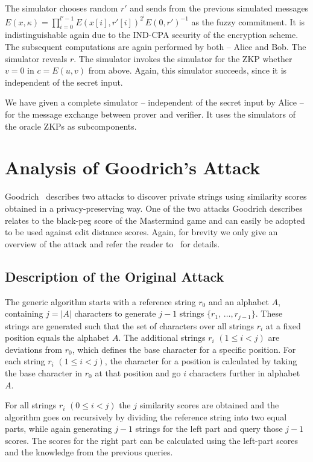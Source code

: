 \documentclass{llncs}
\begin{document}
The simulator chooses random $r'$ and sends from the previous simulated messages $E(x, \kappa) = \prod_{i = 0}^{l'-1} E(x[i], r'[i])^{2^{i}} E(0, r')^{-1}$ as the fuzzy commitment.
It is indistinguishable again due to the IND-CPA security of the encryption scheme.
The subsequent computations are again performed by both -- Alice and Bob.
The simulator reveals $r$.
The simulator invokes the simulator for the ZKP whether $v = 0$ in $c = E(u, v)$ from above.
Again, this simulator succeeds, since it is independent of the secret input.

We have given a complete simulator -- independent of the secret input by Alice -- for the message exchange between prover and verifier.
It uses the simulators of the oracle ZKPs as subcomponents.

\section{Analysis of Goodrich's Attack}
\label{sec:analysis}

Goodrich~\cite{Goo09} describes two attacks to discover private strings using similarity scores obtained in a privacy-preserving way.
One of the two attacks Goodrich describes relates to the black-peg score of the Mastermind game and can easily be adopted to be used against edit distance scores.
Again, for brevity we only give an overview of the attack and refer the reader to~\cite{Goo09} for details.

\subsection{Description of the Original Attack}
\label{sec:goodDescr}

The generic algorithm starts with a reference string $r_0$
and an alphabet $A$, containing $j = |A|$ characters to
generate $j-1$ strings $\{r_1,\,\ldots,r_{j-1}\}$. These strings are generated such that the set of characters over all strings $r_i$ at a fixed position equals the alphabet $A$. The additional strings $r_i$ $(1 \leq i < j )$ are deviations from $r_0$, which defines the base
character for a specific position. For each string $r_i$ $(1 \leq i < j)$, the character for a position is calculated by taking the base character in
$r_0$ at that position and go $i$ characters further in alphabet $A$.

For all strings $r_i$ $(0 \leq i < j)$ the $j$ similarity scores are obtained and
the algorithm goes on recursively by dividing the reference string into two equal parts, while
again generating $j-1$ strings for the left part and query those $j-1$ scores.
The scores for the right part can be calculated using the left-part scores and
the knowledge from the previous queries.
\end{document}
